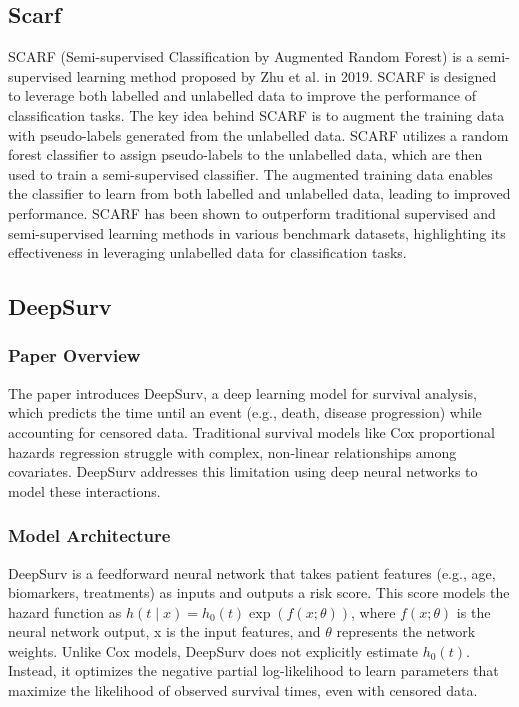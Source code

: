 \documentclass[conference]{ieeeconf}
\begin{document}
\subsection{Scarf}

SCARF (Semi-supervised Classification by Augmented Random Forest) is a semi-supervised learning method proposed by
Zhu et al. in 2019. SCARF is designed to leverage both labelled and unlabelled data
to improve the performance of classification tasks. The key idea behind SCARF is
to augment the training data with pseudo-labels generated from the unlabelled data.
SCARF utilizes a random forest classifier to assign pseudo-labels to the unlabelled
data, which are then used to train a semi-supervised classifier. The augmented
training data enables the classifier to learn from both labelled and unlabelled data,
leading to improved performance. SCARF has been shown to outperform traditional
supervised and semi-supervised learning methods in various benchmark datasets,
highlighting its effectiveness in leveraging unlabelled data for classification tasks.

\subsection{DeepSurv}
\subsubsection{Paper Overview}
The paper introduces DeepSurv, a deep learning model for survival analysis, which predicts the time until an event (e.g., death, disease progression) while accounting for censored data. Traditional survival models like Cox proportional hazards regression struggle with complex, non-linear relationships among covariates. DeepSurv addresses this limitation using deep neural networks to model these interactions.

\subsubsection{Model Architecture}
DeepSurv is a feedforward neural network that takes patient features (e.g., age,
biomarkers, treatments) as inputs and outputs a risk score. This score models the
hazard function as $h(t \mid x) = h_0(t) \exp(f(x; \theta))$, where $f(x; \theta)$ is the neural network
output, x is the input features, and $\theta$ represents the network weights. Unlike
Cox models, DeepSurv does not explicitly estimate $h_0(t)$. Instead, it optimizes
the negative partial log-likelihood to learn parameters that maximize the likelihood
of observed survival times, even with censored data. 
\end{document}

